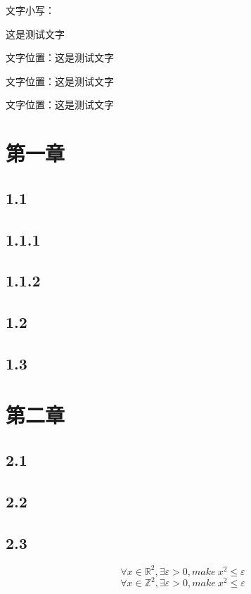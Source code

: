 \documentclass[10pt, a4paper]{article}
\begin{document}
文字小写：\begin{tiny}这是测试文字\end{tiny}

\begin{center}文字位置：这是测试文字\end{center}

\begin{flushleft}文字位置：这是测试文字\end{flushleft}

\begin{flushright}文字位置：这是测试文字\end{flushright}

\section{第一章}
    \subsection{1.1}
        \subsection{1.1.1}
        \subsection{1.1.2}
    \subsection{1.2}
    \subsection{1.3}
\section{第二章}
    \subsection{2.1}
    \subsection{2.2}
    \subsection{2.3}

$$\forall x \in \mathbb{R}^2,\exists \varepsilon > 0,make\ x^2 \leqslant  \varepsilon $$
$$\forall x \in \mathbb{Z}^2,\exists \varepsilon > 0,make\ x^2 \leqslant  \varepsilon $$
\end{document}
